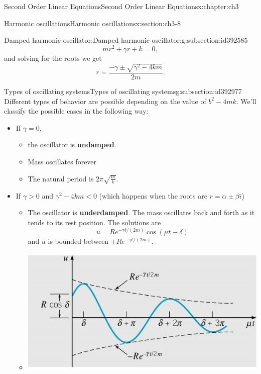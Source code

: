 \documentclass[oneside,10pt,]{book}
\newcommand{\terminology}[1]{\textbf{#1}}
\numberwithin{equation}{section}
\numberwithin{equation}{section}
\newcommand{\lt}{<}
\begin{document}
\begin{chapterptx}{Second Order Linear Equations}{}{Second Order Linear Equations}{}{}{x:chapter:ch3}
\begin{sectionptx}{Harmonic oscillations}{}{Harmonic oscillations}{}{}{x:section:ch3-8}
\begin{subsectionptx}{Damped harmonic oscillator:}{}{Damped harmonic oscillator:}{}{}{g:subsection:id392585}
\begin{equation*}
mr^{2}+\gamma r+k=0,
\end{equation*}
and solving for the roots we get%
\begin{equation*}
r=\frac{-\gamma\pm\sqrt{\gamma^{2}-4km}}{2m}.
\end{equation*}
%
\end{subsectionptx}
%
%
\typeout{************************************************}
\typeout{************************************************}
%
\begin{subsectionptx}{Types of oscillating systems}{}{Types of oscillating systems}{}{}{g:subsection:id392977}
Different types of behavior are possible depending on the value of \(b^{2}-4mk\). We'll classify the possible cases in the following way:%
%
\begin{itemize}[label=\textbullet]
\item{}If \(\gamma=0\),%
\begin{itemize}[label=$\circ$]
\item{}the oscillator is \terminology{undamped}.%
\item{}Mass oscillates forever%
\item{}The natural period is \(2\pi\sqrt{\frac{m}{k}}\).%
\end{itemize}
%
\item{}If \(\gamma>0\) and \(\gamma^{2}-4km\lt0\) (which happens when the roots are \(r=\alpha\pm\beta i\))%
\begin{itemize}[label=$\circ$]
\item{}The oscillator is \terminology{underdamped}. The mass oscillates back and forth as it tends to its rest position. The solutions are%
\begin{equation*}
u=Re^{-\gamma t/(2m)}\cos\left(\mu t-\delta\right)
\end{equation*}
and \(u\) is bounded between \(\pm Re^{-\gamma t/(2m)}\).%
\item{}\begin{image}{0.15}{0.7}{0.15}%
\includegraphics[width=\linewidth]{images/Spring5.jpg}

\end{image}
\end{itemize}
\end{itemize}
\end{subsectionptx}
\end{sectionptx}
\end{chapterptx}
\end{document}
